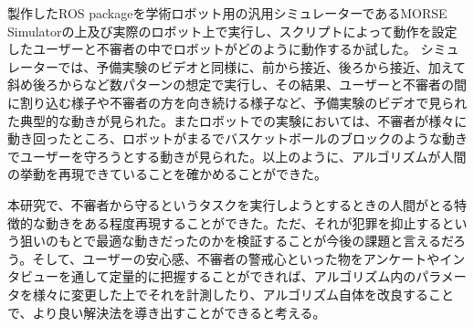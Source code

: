 \documentclass{kuisthesis}
\begin{document}
\begin{jabstract}
製作したROS packageを学術ロボット用の汎用シミュレーターであるMORSE Simulatorの上及び実際のロボット上で実行し、スクリプトによって動作を設定したユーザーと不審者の中でロボットがどのように動作するか試した。
シミュレーターでは、予備実験のビデオと同様に、前から接近、後ろから接近、加えて斜め後ろからなど数パターンの想定で実行し、その結果、ユーザーと不審者の間に割り込む様子や不審者の方を向き続ける様子など、予備実験のビデオで見られた典型的な動きが見られた。またロボットでの実験においては、不審者が様々に動き回ったところ、ロボットがまるでバスケットボールのブロックのような動きでユーザーを守ろうとする動きが見られた。以上のように、アルゴリズムが人間の挙動を再現できていることを確かめることができた。

本研究で、不審者から守るというタスクを実行しようとするときの人間がとる特徴的な動きをある程度再現することができた。ただ、それが犯罪を抑止するという狙いのもとで最適な動きだったのかを検証することが今後の課題と言えるだろう。そして、ユーザーの安心感、不審者の警戒心といった物をアンケートやインタビューを通して定量的に把握することができれば、アルゴリズム内のパラメータを様々に変更した上でそれを計測したり、アルゴリズム自体を改良することで、より良い解決法を導き出すことができると考える。
\end{jabstract}
\end{document}
